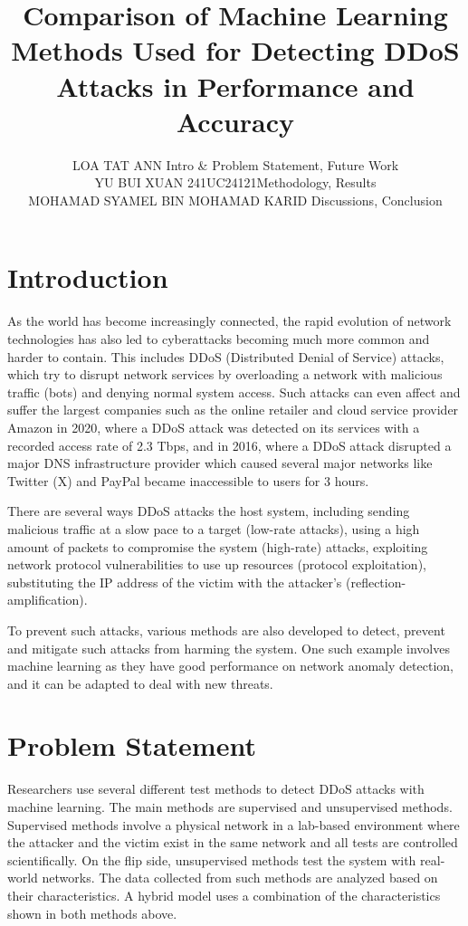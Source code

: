 \documentclass[a4paper, 12pt]{article}
\author{
LOA TAT ANN \quad 1221304731 \quad Intro \& Problem Statement, Future Work\\
YU BUI XUAN \quad 241UC24121\quad Methodology, Results\\
MOHAMAD SYAMEL BIN MOHAMAD KARID \quad Discussions, Conclusion\\
}
\title{Comparison of Machine Learning Methods Used for Detecting DDoS Attacks in Performance and Accuracy}
\begin{document}
\maketitle

\section{Introduction}
As the world has become increasingly connected, the rapid evolution of network technologies has also led to cyberattacks becoming much more common and harder to contain. This includes DDoS (Distributed Denial of Service) attacks, which try to disrupt network services by overloading a network with malicious traffic (bots) and denying normal system access.  Such attacks can even affect and suffer the largest companies such as the online retailer and cloud service provider Amazon in 2020, where a DDoS attack was detected on its services with a recorded access rate of 2.3 Tbps, and in 2016, where a DDoS attack disrupted a major DNS infrastructure provider which caused several major networks like Twitter (X) and PayPal became inaccessible to users for 3 hours.  

There are several ways DDoS attacks the host system, including sending malicious traffic at a slow pace to a target (low-rate attacks), using a high amount of packets to compromise the system (high-rate) attacks, exploiting network protocol vulnerabilities to use up resources (protocol exploitation), substituting the IP address of the victim with the attacker's (reflection-amplification). 


To prevent such attacks, various methods are also developed to detect, prevent and mitigate such attacks from harming the system. One such example involves machine learning as they have good performance on network anomaly detection, and it can be adapted to deal with new threats. 

\section{Problem Statement}
Researchers use several different test methods to detect DDoS attacks with machine learning. The main methods are supervised and unsupervised methods. Supervised methods involve a physical network in a lab-based environment where the attacker and the victim exist in the same network and all tests are controlled scientifically. On the flip side, unsupervised methods test the system with real-world networks. The data collected from such methods are analyzed based on their characteristics. A hybrid model uses a combination of the characteristics shown in both methods above. 
\end{document}
